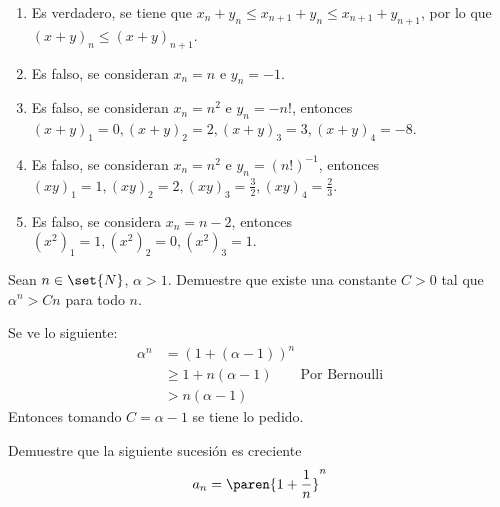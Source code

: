 \documentclass{ayudantia}
\begin{document}
\begin{ans}
    \begin{sol}
        \begin{enumerate}
            \item Es verdadero, se tiene que \(x_n+y_n\leq x_{n+1}+y_n\leq x_{n+1}+y_{n+1}\), por lo que \((x+y)_n\leq (x+y)_{n+1}\).
            \item Es falso, se consideran \(x_n=n\) e \(y_n=-1\).
            \item Es falso, se consideran \(x_n=n^2\) e \(y_n=-n!\), entonces \((x+y)_1=0,(x+y)_2=2,(x+y)_3=3,(x+y)_4=-8\).
            \item Es falso, se consideran \(x_n=n^2\) e \(y_n=(n!)^{-1}\), entonces \((xy)_1=1,(xy)_2=2,(xy)_3=\frac32,(xy)_4=\frac23\).
            \item Es falso, se considera \(x_n=n-2\), entonces \((x^2)_1=1,(x^2)_2=0,(x^2)_3=1\).
        \end{enumerate}
    \end{sol}
\end{ans}


\begin{prob}
    Sean \(n\in\set{N}\), \(\alpha>1\). Demuestre que existe una constante \(C>0\) tal que \(\alpha^n>Cn\) para todo \(n\).
\end{prob}

\begin{ans}
    \begin{sol}
        Se ve lo siguiente:
        \begin{align*}
            \alpha^n&=(1+(\alpha-1))^n\\
            &\geq1+n(\alpha-1)\qquad\text{Por Bernoulli}\\
            &>n(\alpha-1)
        \end{align*}
        Entonces tomando \(C=\alpha-1\) se tiene lo pedido.
    \end{sol}
\end{ans}


\begin{prob}
    Demuestre que la siguiente sucesión es creciente
    \begin{equation*}
        a_n=\paren{1+\frac1n}^n
    \end{equation*}
\end{prob}
\end{document}
